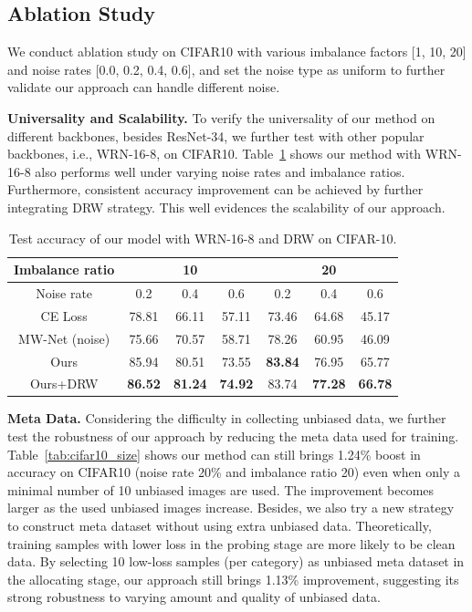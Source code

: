 \documentclass[letterpaper]{article} %
\newcommand{\bd}[1]{\textbf{#1}}
\begin{document}
\subsection{Ablation Study}

We conduct ablation study on CIFAR10 with various imbalance factors [1, 10, 20] and noise rates [0.0, 0.2, 0.4, 0.6], and set the noise type as uniform to further validate our approach can handle different noise.

\noindent
\bd{Universality and Scalability.}
To verify the universality of our method on different backbones, besides ResNet-34, we further test with other popular backbones, i.e., WRN-16-8, on CIFAR10.
Table~\ref{tab:cifar10_wrn} shows our method with WRN-16-8
also performs well under varying noise rates and imbalance ratios.
Furthermore, consistent accuracy improvement can be achieved by further integrating DRW strategy.
This well evidences the scalability of our approach.
\begin{table}[h]
\begin{center}
\begin{adjustbox}{max width=0.47\textwidth}
    \begin{tabular}{c|c|c|c|c|c|c}
    \hline
    Imbalance ratio & \multicolumn{3}{c|}{10}    & \multicolumn{3}{c}{20} \\
    \hline
    Noise rate  & 0.2   & 0.4 & 0.6  & 0.2   & 0.4 & 0.6 \\
    \hline
    CE Loss & 78.81 & 66.11 & 57.11 & 73.46 & 64.68 & 45.17 \\
    \hline
    MW-Net (noise) & 75.66 & 70.57 & 58.71 &   78.26    & 60.95 & 46.09 \\
    \hline
    Ours  & 85.94 & 80.51 & 73.55 & \bd{83.84} & 76.95 & 65.77 \\
    \hline
    Ours+DRW & \bd{86.52} & \bd{81.24} & \bd{74.92} & 83.74 & \bd{77.28} & \bd{66.78} \\
    \hline
    \end{tabular}%
\end{adjustbox}
\caption{
Test accuracy of our model with  WRN-16-8 and DRW on CIFAR-10.
}
\label{tab:cifar10_wrn}
\end{center}
\end{table}

\noindent\bd{Meta Data.}
Considering the difficulty in collecting unbiased data, we further test the robustness of our approach by reducing the meta data used for training.
Table~\ref{tab:cifar10_size} shows our method can still brings 1.24\% boost in accuracy on CIFAR10 (noise rate 20\% and imbalance ratio 20) even when only a  minimal number of 10 unbiased images are used. The improvement becomes larger as the used unbiased images increase.
Besides, we also try a new strategy to construct meta dataset without using extra unbiased data.
Theoretically, training samples with lower loss in the probing stage are more likely to be clean data.
By selecting 10 low-loss samples (per category) as unbiased meta dataset in the allocating stage,
our approach still brings 1.13\% improvement,
suggesting its strong robustness to varying amount and quality of unbiased data.
\end{document}
